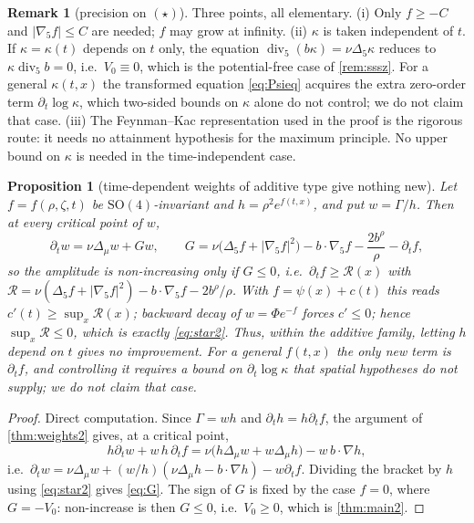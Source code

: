 \documentclass[11pt]{article}
\newtheorem{proposition}[theorem]{Proposition}
\theoremstyle{definition}
\newtheorem{remark}[theorem]{Remark}
\newcommand{\Div}{\operatorname{div}}
\begin{document}
\begin{remark}[precision on $(\star)$]
Three points, all elementary. (i) Only $f\ge-C$ and $|\nabla_5f|\le C$ are
needed; $f$ may grow at infinity. (ii) $\kappa$ is taken independent of $t$.
If $\kappa=\kappa(t)$ depends on $t$ only, the equation
$\Div_5(b\kappa)=\nu\Delta_5\kappa$ reduces to $\kappa\operatorname{div}_5b=0$,
i.e.\ $V_0\equiv0$, which is the potential-free case of \cref{rem:sssz}. For a
general $\kappa(t,x)$ the transformed equation \eqref{eq:Psieq} acquires the
extra zero-order term $\partial_t\log\kappa$, which two-sided bounds on
$\kappa$ alone do not control; we do not claim that case. (iii) The
Feynman--Kac representation used in the proof is the rigorous route: it needs
no attainment hypothesis for the maximum principle. No upper bound on
$\kappa$ is needed in the time-independent case.
\end{remark}

\begin{proposition}[time-dependent weights of additive type give nothing new]
\label{prop:timedep}
Let $f=f(\rho,\zeta,t)$ be $\mathrm{SO}(4)$-invariant and $h=\rho^2e^{f(t,x)}$,
and put $w=\Gamma/h$. Then at every critical point of $w$,
\begin{equation}\label{eq:G}
\partial_tw=\nu\Delta_\mu w+Gw,
\qquad
G=\nu\bigl(\Delta_5f+|\nabla_5f|^2\bigr)-b\cdot\nabla_5f-\frac{2b^\rho}{\rho}-\partial_tf,
\end{equation}
so the amplitude is non-increasing only if $G\le0$, i.e.\
$\partial_tf\ge\mathcal R(x)$ with
$\mathcal R=\nu(\Delta_5f+|\nabla_5f|^2)-b\cdot\nabla_5f-2b^\rho/\rho$.
With $f=\psi(x)+c(t)$ this reads $c'(t)\ge\sup_x\mathcal R(x)$; backward decay
of $w=\Phi e^{-f}$ forces $c'\le0$; hence $\sup_x\mathcal R\le0$, which is
exactly \eqref{eq:star2}. Thus, within the additive family, letting $h$
depend on $t$ gives no improvement. For a general $f(t,x)$ the only new term
is $\partial_tf$, and controlling it requires a bound on $\partial_t\log\kappa$
that spatial hypotheses do not supply; we do not claim that case.
\end{proposition}
\begin{proof}
Direct computation. Since $\Gamma=wh$ and $\partial_th=h\partial_tf$, the
argument of \cref{thm:weights2} gives, at a critical point,
\begin{equation}
h\partial_tw+w\,h\,\partial_tf=\nu\bigl(h\Delta_\mu w+w\Delta_\mu h\bigr)-w\,b\cdot\nabla h,
\end{equation}
i.e.\ $\partial_tw=\nu\Delta_\mu w+(w/h)(\nu\Delta_\mu h-b\cdot\nabla h)-w\partial_tf$.
Dividing the bracket by $h$ using \eqref{eq:star2} gives \eqref{eq:G}. The
sign of $G$ is fixed by the case $f=0$, where $G=-V_0$: non-increase is then
$G\le0$, i.e.\ $V_0\ge0$, which is \cref{thm:main2}.
\end{proof}
\end{document}
